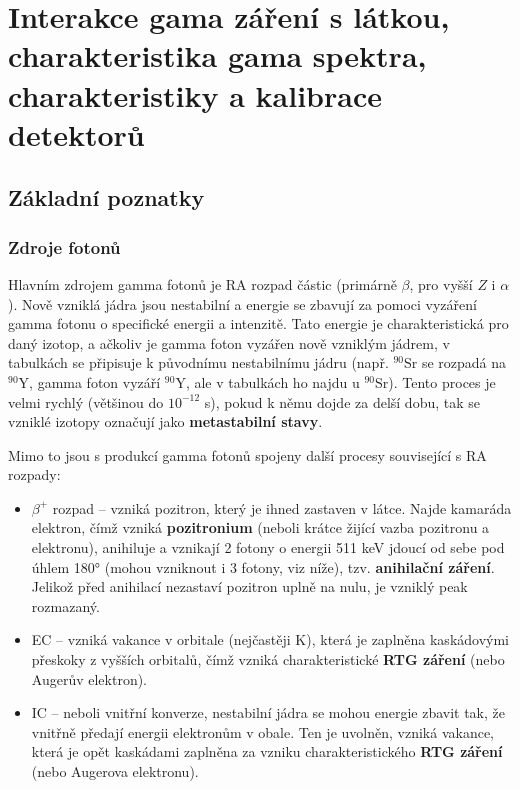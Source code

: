 \section[Interakce gamma záření]{Interakce gama záření s látkou, charakteristika gama spektra, charakteristiky a kalibrace detektorů}

\subsection{Základní poznatky}

\subsubsection{Zdroje fotonů}

Hlavním zdrojem gamma fotonů je RA rozpad částic (primárně $\beta$, pro vyšší $Z$ i $\alpha$). Nově vzniklá jádra jsou nestabilní a energie se zbavují za pomoci vyzáření gamma fotonu o specifické energii a intenzitě. Tato energie je charakteristická pro daný izotop, a ačkoliv je gamma foton vyzářen nově vzniklým jádrem, v tabulkách se připisuje k původnímu nestabilnímu jádru (např. $^{90}$Sr se rozpadá na $^{90}$Y, gamma foton vyzáří $^{90}$Y, ale v tabulkách ho najdu u $^{90}$Sr). Tento proces je velmi rychlý (většinou do $10^{-12}$ s), pokud k němu dojde za delší dobu, tak se vzniklé izotopy označují jako \textbf{metastabilní stavy}.

Mimo to jsou s produkcí gamma fotonů spojeny další procesy související s RA rozpady:

\begin{itemize}
    \item $\beta^+$ rozpad -- vzniká pozitron, který je ihned zastaven v látce. Najde kamaráda elektron, čímž vzniká \textbf{pozitronium} (neboli krátce žijící vazba pozitronu a elektronu), anihiluje a vznikají 2 fotony o energii 511 keV jdoucí od sebe pod úhlem 180° (mohou vzniknout i 3 fotony, viz níže), tzv. \textbf{anihilační záření}. Jelikož před anihilací nezastaví pozitron uplně na nulu, je vzniklý peak rozmazaný.
    \item EC -- vzniká vakance v orbitale (nejčastěji K), která je zaplněna kaskádovými přeskoky z vyšších orbitalů, čímž vzniká charakteristické \textbf{RTG záření} (nebo Augerův elektron).
    \item IC -- neboli vnitřní konverze, nestabilní jádra se mohou energie zbavit tak, že vnitřně předají energii elektronům v obale. Ten je uvolněn, vzniká vakance, která je opět kaskádami zaplněna za vzniku charakteristického \textbf{RTG záření} (nebo Augerova elektronu).
\end{itemize}

